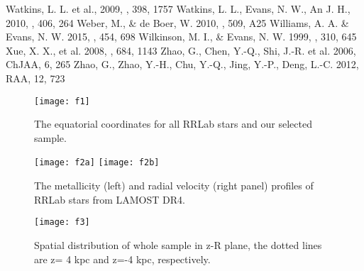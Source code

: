 \documentclass[12pt,preprint]{aastex}
\begin{document}
\begin{thebibliography}{99}
Watkins, L. L. et al., 2009, \mnras, 398, 1757
Watkins, L. L., Evans, N. W., An J. H., 2010, \mnras, 406, 264
Weber, M., \& de Boer, W. 2010, \aap, 509, A25
Williams, A. A. \& Evans, N. W. 2015, \mnras, 454, 698
Wilkinson, M. I., \& Evans, N. W. 1999, \mnras, 310, 645
Xue, X. X., et al. 2008, \apj, 684, 1143
Zhao, G., Chen, Y.-Q., Shi, J.-R. et al. 2006,
ChJAA, 6, 265
Zhao, G., Zhao, Y.-H., Chu, Y.-Q., Jing, Y.-P., Deng, L.-C. 2012,
RAA, 12, 723



\end{thebibliography}

\begin{figure}
\centering
\texttt{[image: f1]}
\caption{The equatorial coordinates for all RRLab stars and our selected sample.}\label{fig:1}
\end{figure}

\clearpage

\begin{figure}
\centering
\texttt{[image: f2a]}
\texttt{[image: f2b]}
\caption{The metallicity (left) and radial velocity (right panel) profiles of RRLab stars from LAMOST DR4.}\label{fig:1}
\end{figure}

\clearpage



\begin{figure}
\centering
\texttt{[image: f3]}
\caption{Spatial distribution of whole sample in z-R plane, the
dotted lines are z= 4 kpc and z=-4 kpc, respectively.}\label{fig:1}
\end{figure}
\end{document}
